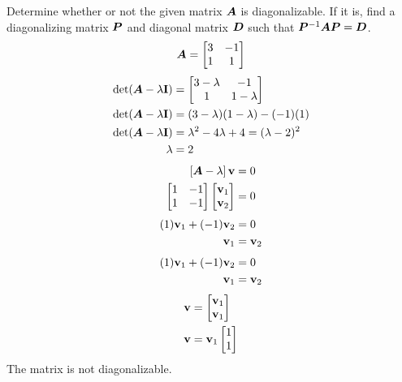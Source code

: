 \documentclass{article}
\begin{document}
Determine whether or not the given matrix $ \bm{A} $ is diagonalizable. If it is, find a diagonalizing matrix $ \bm{P} $ and diagonal matrix $ \bm{D} $ such that $ \bm{P}^{-1}\bm{A}\bm{P} = \bm{D} $.
\begin{equation*}
	\bm{A} =
		\begin{bmatrix}
			3 & -1 \\
			1 & 1
		\end{bmatrix}
\end{equation*}
\begin{align*}
	\det( \matr{A} - \lambda \vect{I} ) & =
		\begin{bmatrix}
			3 - \lambda & -1 \\
			1 & 1 - \lambda
		\end{bmatrix} \\
	\det( \matr{A} - \lambda \vect{I} ) & =
		(3 - \lambda)(1 - \lambda) - (-1)(1) \\
	\det( \matr{A} - \lambda \vect{I} ) & =
		\lambda^2 - 4\lambda + 4 = (\lambda - 2)^2 \\
	\lambda & = 2
\end{align*}
\begin{align*}
	\left[ \matr{A} - \lambda \right] \vect{v} & = 0 \\
	\begin{bmatrix}
		1 & -1 \\
		1 & -1
	\end{bmatrix}
	\begin{bmatrix} \vect{v}_1 \\ \vect{v}_2 \end{bmatrix} & = 0
\end{align*}
\begin{align*}
	(1)\vect{v}_1 + (-1)\vect{v}_2 & = 0 \\
	\vect{v}_1 & = \vect{v}_2
\end{align*}
\begin{align*}
	(1)\vect{v}_1 + (-1)\vect{v}_2 & = 0 \\
	\vect{v}_1 & = \vect{v}_2
\end{align*}
\begin{align*}
	\vect{v} & = \begin{bmatrix} \vect{v}_1 \\ \vect{v}_1 \end{bmatrix} \\
	\vect{v} & = \vect{v}_1 \begin{bmatrix} 1 \\ 1 \end{bmatrix}
\end{align*}
The matrix is not diagonalizable.
\end{document}
